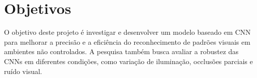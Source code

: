\section{Objetivos}
O objetivo deste projeto é investigar e desenvolver um modelo baseado em CNN para melhorar a precisão e a eficiência do reconhecimento de padrões visuais em ambientes não controlados. A pesquisa também busca avaliar a robustez das CNNs em diferentes condições, como variação de iluminação, occlusões parciais e ruído visual.